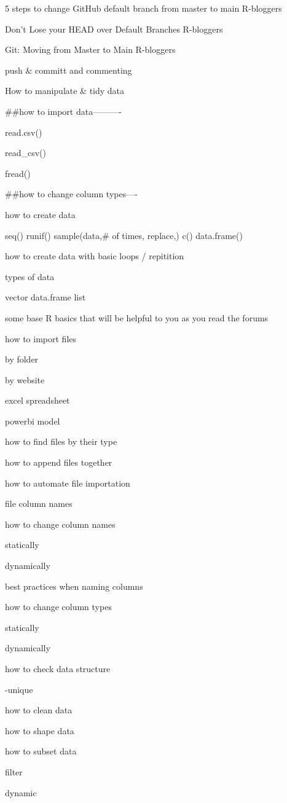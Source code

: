 \documentclass[
  letterpaper,
  DIV=11,
  numbers=noendperiod]{scrreprt}
\begin{document}
5 steps to change GitHub default branch from master to main \textbar{}
R-bloggers

Don't Lose your HEAD over Default Branches \textbar{} R-bloggers

Git: Moving from Master to Main \textbar{} R-bloggers

push \& committ and commenting

How to manipulate \& tidy data

\#\#how to import data----------

read.csv()

read\_csv()

fread()

\#\#how to change column types----

how to create data

seq() runif() sample(data,\# of times, replace,) c() data.frame()

how to create data with basic loops / repitition

types of data

vector data.frame list

some base R basics that will be helpful to you as you read the forums

how to import files

by folder

by website

excel spreadsheet

powerbi model

how to find files by their type

how to append files together

how to automate file importation

file column names

how to change column names

statically

dynamically

best practices when naming columns

how to change column types

statically

dynamically

how to check data structure

-unique

how to clean data

how to shape data

how to subset data

filter

dynamic
\end{document}
